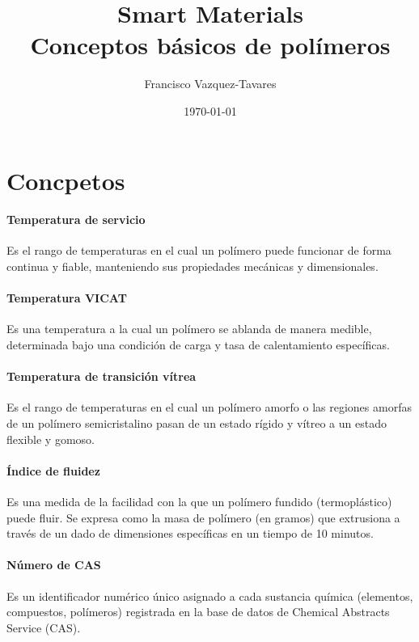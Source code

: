 \documentclass[a4paper]{tufte-handout} %
\title{Smart Materials\\ Conceptos básicos de polímeros}
\author{Francisco Vazquez-Tavares}
\date{\today} %
\begin{document}
\maketitle %
\justifying


\section*{Concpetos}

\paragraph{Temperatura de servicio}
Es el rango de temperaturas en el cual un polímero puede funcionar de forma continua y fiable, manteniendo sus propiedades mecánicas y dimensionales.

\paragraph{Temperatura VICAT}
Es una temperatura a la cual un polímero se ablanda de manera medible, determinada bajo una condición de carga y tasa de calentamiento específicas.

\paragraph{Temperatura de transición vítrea}
Es el rango de temperaturas en el cual un polímero amorfo o las regiones amorfas de un polímero semicristalino pasan de un estado rígido y vítreo a un estado flexible y gomoso.

\paragraph{Índice de fluidez}
Es una medida de la facilidad con la que un polímero fundido (termoplástico) puede fluir. Se expresa como la masa de polímero (en gramos) que extrusiona a través de un dado de dimensiones específicas en un tiempo de 10 minutos.

\paragraph{Número de CAS}
Es un identificador numérico único asignado a cada sustancia química (elementos, compuestos, polímeros) registrada en la base de datos de Chemical Abstracts Service (CAS).
\end{document}
